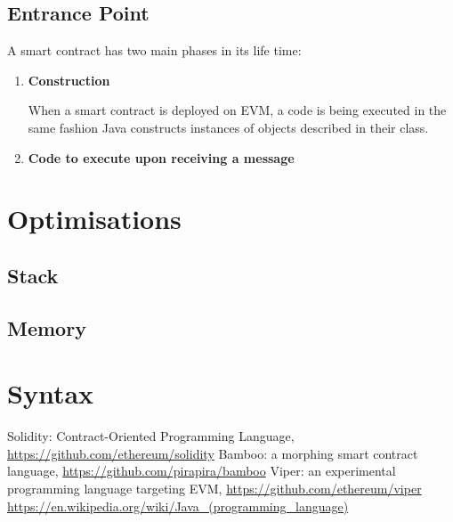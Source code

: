 \documentclass{article}
\begin{document}
\subsection{Entrance Point}
\par A smart contract has two main phases in its life time:
\begin{enumerate}
  \item
    \textbf{Construction}
    \par When a smart contract is deployed on EVM, a code is being executed in the same fashion Java\cite{java} constructs instances of objects described in their class.
  \item
    \textbf{Code to execute upon receiving a message}
\end{enumerate}

\section{Optimisations}
\subsection{Stack}
\label{subsec:stack}
\subsection{Memory}
\label{subsec:memory}
\section{Syntax}

\begin{thebibliography}{9}

  Solidity: Contract-Oriented Programming Language, \url{https://github.com/ethereum/solidity}
  Bamboo: a morphing smart contract language, \url{https://github.com/pirapira/bamboo}
  Viper: an experimental programming language targeting EVM, \url{https://github.com/ethereum/viper}
  \url{https://en.wikipedia.org/wiki/Java\_(programming\_language)}

\end{thebibliography}
\end{document}
